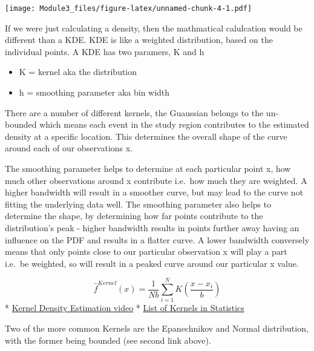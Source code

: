 \documentclass[]{book}
\newenvironment{Shaded}{\begin{snugshade}}{\end{snugshade}}
\newcommand{\KeywordTok}[1]{\textcolor[rgb]{0.13,0.29,0.53}{\textbf{#1}}}
\newcommand{\StringTok}[1]{\textcolor[rgb]{0.31,0.60,0.02}{#1}}
\newcommand{\OperatorTok}[1]{\textcolor[rgb]{0.81,0.36,0.00}{\textbf{#1}}}
\newcommand{\NormalTok}[1]{#1}
\providecommand{\tightlist}{%
  \setlength{\itemsep}{0pt}\setlength{\parskip}{0pt}}
\theoremstyle{definition}
\theoremstyle{definition}
\theoremstyle{definition}
\theoremstyle{remark}
\begin{document}
\begin{Shaded}
\end{Shaded}

\texttt{[image: Module3\_files/figure-latex/unnamed-chunk-4-1.pdf]}

If we were just calculating a density, then the mathmatical calulcation
would be different than a KDE. KDE is like a weighted distribution,
based on the individual points. A KDE has two paramers, K and h

\begin{itemize}
\tightlist
\item
  K = kernel aka the distribution
\item
  h = smoothing parameter aka bin width
\end{itemize}

There are a number of different kernels, the Guaussian belongs to the
un-bounded which means each event in the study region contributes to the
estimated density at a specific location. This determines the overall
shape of the curve around each of our observations x.

The smoothing parameter helps to determine at each particular point x,
how much other observations around x contribute i.e.~how much they are
weighted. A higher bandwidth will result in a smoother curve, but may
lead to the curve not fitting the underlying data well. The smoothing
parameter also helps to determine the shape, by determining how far
points contribute to the distribution's peak - higher bandwidth results
in points further away having an influence on the PDF and results in a
flatter curve. A lower bandwidth conversely means that only points close
to our particular observation x will play a part i.e.~be weighted, so
will result in a peaked curve around our particular x value.

\[\hat{f} ^{Kernel} (x) = \left. {\frac{1}{Nb} \sum_{i=1}^{N} K (\frac{x - x_i}{b})} \right.\]
* \href{https://www.youtube.com/watch?v=gPWsDh59zdo}{Kernel Density
Estimation video} *
\href{https://en.wikipedia.org/wiki/Kernel_(statistics)}{List of Kernels
in Statistics}

Two of the more common Kernels are the Epanechnikov and Normal
distribution, with the former being bounded (see second link above).
\end{document}
